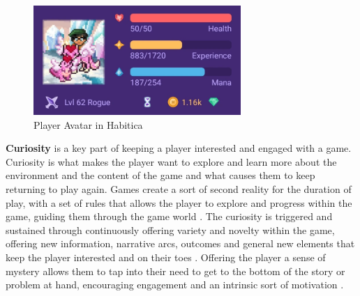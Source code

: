 \begin{figure}[h]
    \centering
    \includegraphics[width=0.7\textwidth]{figures/avatar}
    \caption{Player Avatar in Habitica}
    \label{fig:3}
\end{figure}

\textbf{Curiosity} is a key part of keeping a player interested and engaged with a game. Curiosity is what makes the player want to explore and learn more about the environment and the content of the game and what causes them to keep returning to play again. Games create a sort of second reality for the duration of play, with a set of rules that allows the player to explore and progress within the game, guiding them through the game world \cite{aspects}. The curiosity is triggered and sustained through continuously offering variety and novelty within the game, offering new information, narrative arcs, outcomes and general new elements that keep the player interested and on their toes \cite{engage} \cite{fail}. Offering the player a sense of mystery allows them to tap into their need to get to the bottom of the story or problem at hand, encouraging engagement and an intrinsic sort of motivation \cite{model}.

